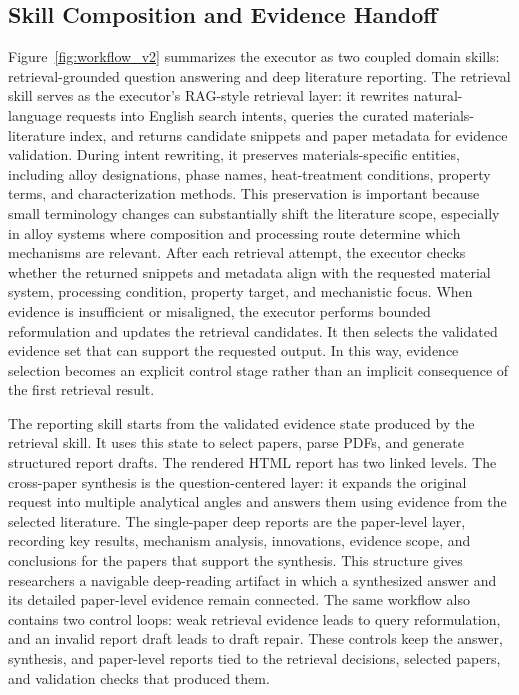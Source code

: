 \documentclass{article}
\begin{document}
\subsection{Skill Composition and Evidence Handoff}

Figure~\ref{fig:workflow_v2} summarizes the executor as two coupled domain skills: retrieval-grounded question answering and deep literature reporting. The retrieval skill serves as the executor's RAG-style retrieval layer: it rewrites natural-language requests into English search intents, queries the curated materials-literature index, and returns candidate snippets and paper metadata for evidence validation. During intent rewriting, it preserves materials-specific entities, including alloy designations, phase names, heat-treatment conditions, property terms, and characterization methods. This preservation is important because small terminology changes can substantially shift the literature scope, especially in alloy systems where composition and processing route determine which mechanisms are relevant. After each retrieval attempt, the executor checks whether the returned snippets and metadata align with the requested material system, processing condition, property target, and mechanistic focus. When evidence is insufficient or misaligned, the executor performs bounded reformulation and updates the retrieval candidates. It then selects the validated evidence set that can support the requested output. In this way, evidence selection becomes an explicit control stage rather than an implicit consequence of the first retrieval result.

The reporting skill starts from the validated evidence state produced by the retrieval skill. It uses this state to select papers, parse PDFs, and generate structured report drafts. The rendered HTML report has two linked levels. The cross-paper synthesis is the question-centered layer: it expands the original request into multiple analytical angles and answers them using evidence from the selected literature. The single-paper deep reports are the paper-level layer, recording key results, mechanism analysis, innovations, evidence scope, and conclusions for the papers that support the synthesis. This structure gives researchers a navigable deep-reading artifact in which a synthesized answer and its detailed paper-level evidence remain connected. The same workflow also contains two control loops: weak retrieval evidence leads to query reformulation, and an invalid report draft leads to draft repair. These controls keep the answer, synthesis, and paper-level reports tied to the retrieval decisions, selected papers, and validation checks that produced them.
\end{document}

